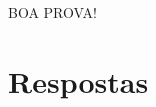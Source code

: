 \documentclass[12pt,a4paper]{article}
\begin{document}
\begin{center}
BOA PROVA!
\end{center}

\newpage
\restoregeometry
\section*{Respostas}
\shipoutAnswer
\end{document}
